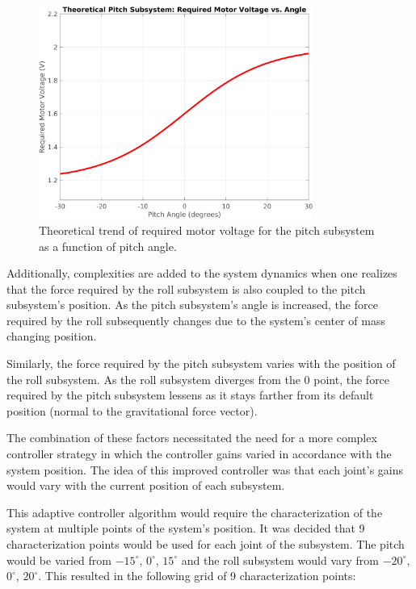 \begin{figure}[htbp]
    \centering
\includegraphics[width=0.8\textwidth]{figures/Pitch_Subsystem_Theoretical_Trend.png}
    \caption{Theoretical trend of required motor voltage for the pitch subsystem as a function of pitch angle.}
    \label{fig:pitch_voltage_trend}
\end{figure}

Additionally, complexities are added to the system dynamics when one realizes that the force required by the roll subsystem is also coupled to the pitch subsystem's position. As the pitch subsystem's angle is increased, the force required by the roll subsequently changes due to the system's center of mass changing position.

Similarly, the force required by the pitch subsystem varies with the position of the roll subsystem. As the roll subsystem diverges from the 0 point, the force required by the pitch subsystem lessens as it stays farther from its default position (normal to the gravitational force vector).

The combination of these factors necessitated the need for a more complex controller strategy in which the controller gains varied in accordance with the system position. The idea of this improved controller was that each joint's gains would vary with the current position of each subsystem.

This adaptive controller algorithm would require the characterization of the system at multiple points of the system's position. It was decided that 9 characterization points would be used for each joint of the subsystem. The pitch would be varied from $-15^\circ$, $0^\circ$, $15^\circ$ and the roll subsystem would vary from $-20^\circ$, $0^\circ$, $20^\circ$. This resulted in the following grid of 9 characterization points:

